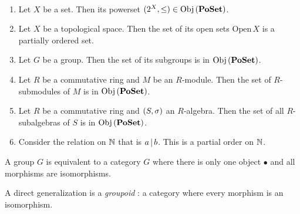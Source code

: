 \begin{eg}~
  \begin{enumerate}
    \item Let $X$ be a set. Then its powerset $(2^X,\leq) \in \mathrm{Obj}\left(\mathbf{PoSet}\right)$. 
    \item Let $X$ be a topological space. 
    Then the set of its open sets $\mathrm{Open}\,X$ is a partially ordered set.
    \item Let $G$ be a group. 
    Then the set of its subgroups is in $\mathrm{Obj}\left(\mathbf{PoSet}\right)$.
    \item Let $R$ be a commutative ring and $M$ be an $R$-module.
    Then the set of $R$-submodules of $M$ is in $\mathrm{Obj}\left(\mathbf{PoSet}\right)$.
    \item Let $R$ be a commutative ring and $(S,\sigma)$ an $R$-algebra. 
    Then the set of all $R$-subalgebras of $S$ is in $\mathrm{Obj}\left(\mathbf{PoSet}\right)$. 
    \item Consider the relation on $\mathbb{N}$ that is $a \,|\, b$. 
    This is a partial order on $\mathbb{N}$. 
  \end{enumerate}
\end{eg}

\begin{eg}
  
  A group $G$ is equivalent to 
  a category $G$ where there is only one object $\bullet$ and 
  all morphisms are isomorphisms. 

  A direct generalization is a \emph{groupoid} : 
  a category where every morphism is an isomorphism. 
\end{eg}